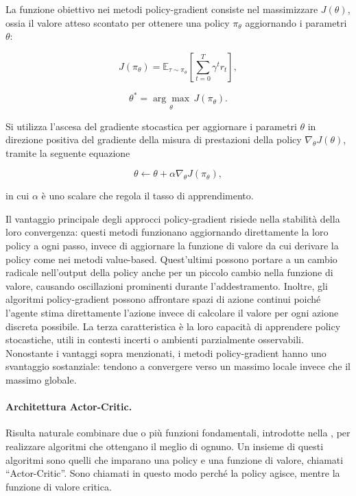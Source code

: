 La funzione obiettivo nei metodi policy-gradient consiste nel massimizzare $J(\theta)$, ossia il valore atteso scontato per ottenere una policy $\pi_\theta$ aggiornando i parametri $\theta$:

\begin{equation}
    J(\pi_\theta) = \mathbb{E}_{\tau \sim \pi_\theta} \left[ \sum_{t=0}^{T} \gamma^t r_t\right],
\end{equation}

\begin{equation}
    \theta^\ast = \underset{\theta}{\arg\max} \, J(\pi_\theta).
\end{equation}

Si utilizza l'ascesa del gradiente stocastica per aggiornare i parametri $\theta$ in direzione positiva del gradiente della misura di prestazioni della policy $\nabla_\theta J(\theta)$, tramite la seguente equazione

\begin{equation}
    \theta \gets \theta + \alpha \nabla_\theta J(\pi_\theta),
\end{equation}

in cui $\alpha$ è uno scalare che regola il tasso di apprendimento.

Il vantaggio principale degli approcci policy-gradient risiede nella stabilità della loro convergenza: questi metodi funzionano aggiornando direttamente la loro policy a ogni passo, invece di aggiornare la funzione di valore da cui derivare la policy come nei metodi value-based. Quest'ultimi possono portare a un cambio radicale nell'output della policy anche per un piccolo cambio nella funzione di valore, causando oscillazioni prominenti durante l’addestramento. Inoltre, gli algoritmi policy-gradient possono affrontare spazi di azione continui poiché l’agente stima direttamente l’azione invece di calcolare il valore per ogni azione discreta possibile. La terza caratteristica è la loro capacità di apprendere policy stocastiche, utili in contesti incerti o ambienti parzialmente osservabili. Nonostante i vantaggi sopra menzionati, i metodi policy-gradient hanno uno svantaggio sostanziale: tendono a convergere verso un massimo locale invece che il massimo globale.

\paragraph{Architettura Actor-Critic.} Risulta naturale combinare due o più funzioni fondamentali, introdotte nella , per realizzare algoritmi che ottengano il meglio di ognuno. Un insieme di questi algoritmi sono quelli che imparano una policy e una funzione di valore, chiamati ``Actor-Critic''. Sono chiamati in questo modo perché la policy agisce, mentre la funzione di valore critica.

